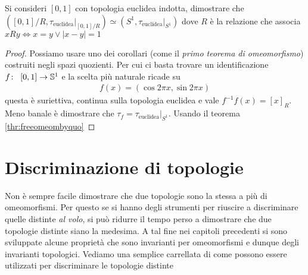 \begin{theorem}
	Si consideri $\left[0,1\right]$ con topologia euclidea indotta, dimostrare che $(\left[0,1\right]/R, \tau_{\text{euclidea}}|_{\left[0,1\right]/R}) \simeq (S^1, \tau_{\text{euclidea}}|_{S^1})$ dove $R$ è la relazione che associa $xRy \Leftrightarrow x = y \lor |x - y| = 1$
\end{theorem}
\begin{proof}
	Possiamo usare uno dei corollari (come il \textit{primo teorema di omeomorfismo}) costruiti negli spazi quozienti. Per cui ci basta trovare un identificazione $f \colon\ \left[0,1\right] \rightarrow \mathbb{S}^1$ e la scelta più naturale ricade su 
	\begin{equation}
	\begin{aligned}
		f(x) = (\cos 2\pi x, \sin 2 \pi x)
	\end{aligned}
	\end{equation}
	questa è suriettiva, continua sulla topologia euclidea e vale $f^{-1}f(x) = \left[x\right]_R$. Meno banale è dimostrare che $\tau_f = \tau_{\text{euclidea}}|_{S^1}$. Usando il teorema \ref{thr:freeomeombyquo}
\end{proof}

\section{Discriminazione di topologie}

Non è sempre facile dimostrare che due topologie sono la stessa a più di omeomorfismi. Per questo se si hanno degli strumenti per riuscire a discriminare quelle distinte \textit{al volo}, si può ridurre il tempo perso a dimostrare che due topologie distinte siano la medesima. A tal fine nei capitoli precedenti si sono sviluppate alcune proprietà che sono invarianti per omeomorfismi e dunque degli invarianti topologici. Vediamo una semplice carrellata di come possono essere utilizzati per discriminare le topologie distinte

